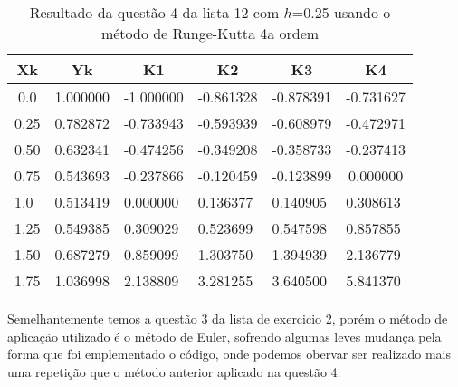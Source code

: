 \documentclass[12pt]{article}
\begin{document}
\begin{table}[!h]
    \centering
\begin{tabular}{c|c|c|c|c|c}
\textbf{Xk}               & \textbf{Yk}                   & \textbf{K1}                   & \textbf{K2}                   & \textbf{K3}                   & \textbf{K4}                  \\ \hline
0.0                       & 1.000000                      & -1.000000                     & -0.861328                     & -0.878391                     & -0.731627                    \\
0.25                      & 0.782872                      & -0.733943                     & -0.593939                     & -0.608979                     & -0.472971                    \\
0.50                      & 0.632341                      & -0.474256                     & -0.349208                     & -0.358733                     & -0.237413                    \\
0.75                      & 0.543693                      & -0.237866                     & -0.120459                     & -0.123899                     & 0.000000                     \\
\multicolumn{1}{l|}{1.0}  & \multicolumn{1}{l|}{0.513419} & \multicolumn{1}{l|}{0.000000} & \multicolumn{1}{l|}{0.136377} & \multicolumn{1}{l|}{0.140905} & \multicolumn{1}{l}{0.308613} \\
\multicolumn{1}{l|}{1.25} & \multicolumn{1}{l|}{0.549385} & \multicolumn{1}{l|}{0.309029} & \multicolumn{1}{l|}{0.523699} & \multicolumn{1}{l|}{0.547598} & \multicolumn{1}{l}{0.857855} \\
\multicolumn{1}{l|}{1.50} & \multicolumn{1}{l|}{0.687279} & \multicolumn{1}{l|}{0.859099} & \multicolumn{1}{l|}{1.303750} & \multicolumn{1}{l|}{1.394939} & \multicolumn{1}{l}{2.136779} \\
\multicolumn{1}{l|}{1.75} & \multicolumn{1}{l|}{1.036998} & \multicolumn{1}{l|}{2.138809} & \multicolumn{1}{l|}{3.281255} & \multicolumn{1}{l|}{3.640500} & \multicolumn{1}{l}{5.841370} \\ \hline
\end{tabular}
    \caption{Resultado da questão 4 da lista 12 com $h$=0.25 usando o método de Runge-Kutta 4a ordem}
\end{table}

Semelhantemente temos a questão 3 da lista de exercicio 2, porém o método de aplicação utilizado é o método de Euler, sofrendo algumas leves mudança pela forma que foi emplementado o código, onde podemos obervar ser realizado mais uma repetição que o método anterior aplicado na questão 4. 
\end{document}
